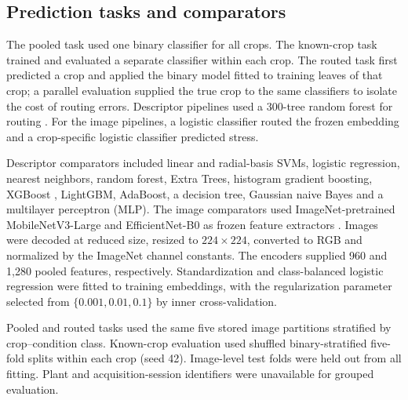 \subsection{Prediction tasks and comparators}
The pooled task used one binary classifier for all crops. The known-crop task trained and evaluated a separate classifier within each crop. The routed task first predicted a crop and applied the binary model fitted to training leaves of that crop; a parallel evaluation supplied the true crop to the same classifiers to isolate the cost of routing errors. Descriptor pipelines used a 300-tree random forest for routing \citep{Breiman2001}. For the image pipelines, a logistic classifier routed the frozen embedding and a crop-specific logistic classifier predicted stress.

Descriptor comparators included linear and radial-basis SVMs, logistic regression, nearest neighbors, random forest, Extra Trees, histogram gradient boosting, XGBoost \citep{Chen2016}, LightGBM, AdaBoost, a decision tree, Gaussian naive Bayes and a multilayer perceptron (MLP). The image comparators used ImageNet-pretrained MobileNetV3-Large \citep{Howard2019} and EfficientNet-B0 \citep{Tan2019} as frozen feature extractors \citep{Kornblith2019}. Images were decoded at reduced size, resized to $224\times224$, converted to RGB and normalized by the ImageNet channel constants. The encoders supplied 960 and 1,280 pooled features, respectively. Standardization and class-balanced logistic regression were fitted to training embeddings, with the regularization parameter selected from $\{0.001,0.01,0.1\}$ by inner cross-validation.

Pooled and routed tasks used the same five stored image partitions stratified by crop--condition class. Known-crop evaluation used shuffled binary-stratified five-fold splits within each crop (seed 42). Image-level test folds were held out from all fitting. Plant and acquisition-session identifiers were unavailable for grouped evaluation.

